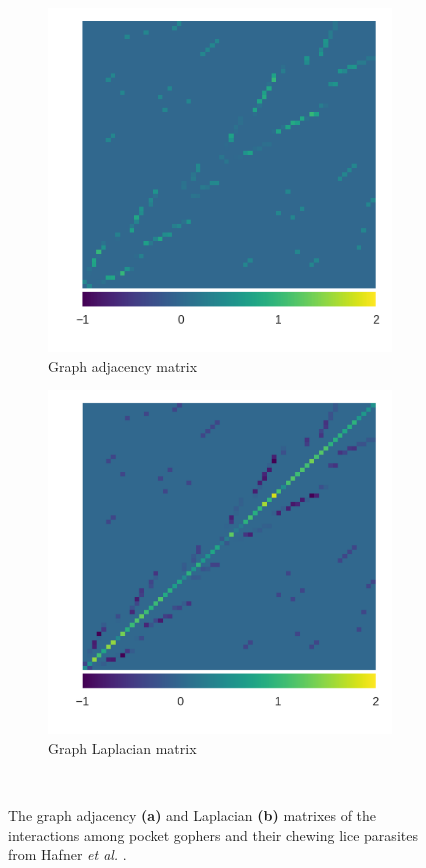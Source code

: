 
\begin{figure}
    \centering
    \begin{subfigure}[b]{0.45\textwidth}
        \includegraphics[width=\textwidth]{FishPoo/figures/gopher_louse_adjacency}
        \small
        \caption{Graph adjacency matrix}
    \end{subfigure}
    \begin{subfigure}[b]{0.45\textwidth}
        \includegraphics[width=\textwidth]{FishPoo/figures/gopher_louse_laplacian}
        \small
        \caption{Graph Laplacian matrix}
    \end{subfigure}\\
    \caption{The graph adjacency \textbf{(a)} and Laplacian \textbf{(b)} matrixes of the interactions among pocket gophers and their chewing lice parasites from Hafner {\em et al.} \cite{hafner1994disparate}.}
    \label{fig:FP_ajlp}
\end{figure}